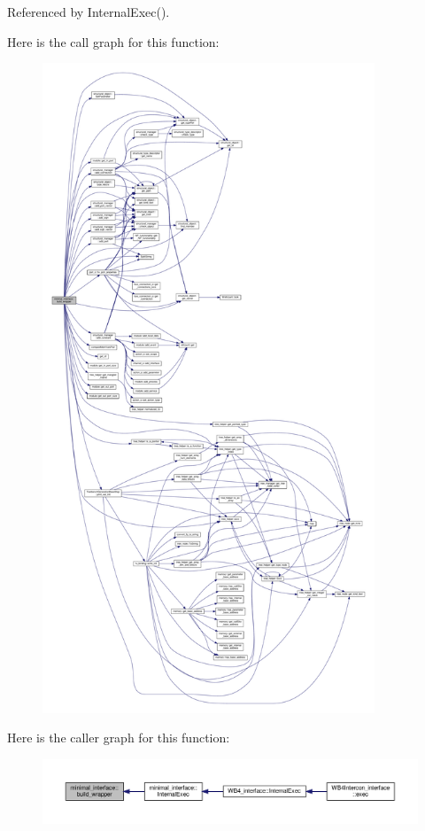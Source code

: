 Referenced by Internal\+Exec().

Here is the call graph for this function\+:
\nopagebreak
\begin{figure}[H]
\begin{center}
\leavevmode
\includegraphics[height=550pt]{dc/da7/classminimal__interface_adb6448d855a8f541648b22bbffa7993c_cgraph}
\end{center}
\end{figure}
Here is the caller graph for this function\+:
\nopagebreak
\begin{figure}[H]
\begin{center}
\leavevmode
\includegraphics[width=350pt]{dc/da7/classminimal__interface_adb6448d855a8f541648b22bbffa7993c_icgraph}
\end{center}
\end{figure}
\mbox{\label{classminimal__interface_a38ab4c7e28f6f8c7dd9cd98989b8bddf}} 

